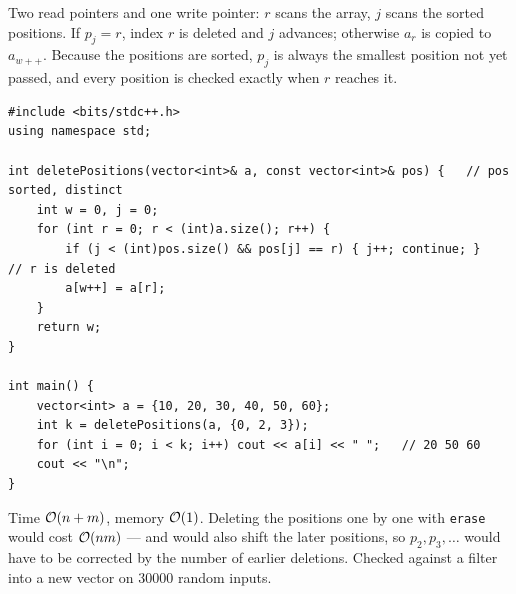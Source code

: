 \begin{solutionbox}
Two read pointers and one write pointer: $r$ scans the array, $j$ scans the sorted positions. If $p_j = r$, index $r$ is deleted and $j$ advances; otherwise $a_r$ is copied to $a_{w++}$. Because the positions are sorted, $p_j$ is always the smallest position not yet passed, and every position is checked exactly when $r$ reaches it.
\begin{lstlisting}[style=cpp]
#include <bits/stdc++.h>
using namespace std;

int deletePositions(vector<int>& a, const vector<int>& pos) {   // pos sorted, distinct
    int w = 0, j = 0;
    for (int r = 0; r < (int)a.size(); r++) {
        if (j < (int)pos.size() && pos[j] == r) { j++; continue; }   // r is deleted
        a[w++] = a[r];
    }
    return w;
}

int main() {
    vector<int> a = {10, 20, 30, 40, 50, 60};
    int k = deletePositions(a, {0, 2, 3});
    for (int i = 0; i < k; i++) cout << a[i] << " ";   // 20 50 60
    cout << "\n";
}
\end{lstlisting}
Time $\mathcal{O}(n + m)$, memory $\mathcal{O}(1)$. Deleting the positions one by one with \texttt{erase} would cost $\mathcal{O}(nm)$ --- and would also shift the later positions, so $p_2, p_3, \dots$ would have to be corrected by the number of earlier deletions. Checked against a filter into a new vector on 30000 random inputs.
\end{solutionbox}
